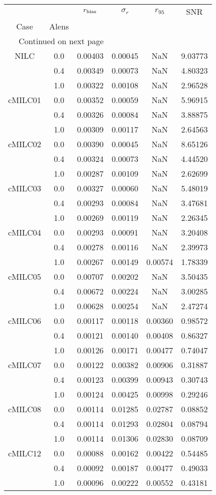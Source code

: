 \begin{longtable}{cccccc}
\toprule
     &     &  $r_{\rm bias}$  &  $\sigma_r$ &  $r_{95}$ &     SNR \\
Case & Alens &                  &             &           &         \\
\midrule
\endhead
\midrule
\multicolumn{3}{r}{{Continued on next page}} \\
\midrule
\endfoot

\bottomrule
\endlastfoot
NILC & 0.0 & 0.00403 & 0.00045 & NaN & 9.03773 \\
     & 0.4 & 0.00349 & 0.00073 & NaN & 4.80323 \\
     & 1.0 & 0.00322 & 0.00108 & NaN & 2.96528 \\
cMILC01 & 0.0 & 0.00352 & 0.00059 & NaN & 5.96915 \\
     & 0.4 & 0.00326 & 0.00084 & NaN & 3.88875 \\
     & 1.0 & 0.00309 & 0.00117 & NaN & 2.64563 \\
cMILC02 & 0.0 & 0.00390 & 0.00045 & NaN & 8.65126 \\
     & 0.4 & 0.00324 & 0.00073 & NaN & 4.44520 \\
     & 1.0 & 0.00287 & 0.00109 & NaN & 2.62699 \\
cMILC03 & 0.0 & 0.00327 & 0.00060 & NaN & 5.48019 \\
     & 0.4 & 0.00293 & 0.00084 & NaN & 3.47681 \\
     & 1.0 & 0.00269 & 0.00119 & NaN & 2.26345 \\
cMILC04 & 0.0 & 0.00293 & 0.00091 & NaN & 3.20408 \\
     & 0.4 & 0.00278 & 0.00116 & NaN & 2.39973 \\
     & 1.0 & 0.00267 & 0.00149 & 0.00574 & 1.78339 \\
cMILC05 & 0.0 & 0.00707 & 0.00202 & NaN & 3.50435 \\
     & 0.4 & 0.00672 & 0.00224 & NaN & 3.00285 \\
     & 1.0 & 0.00628 & 0.00254 & NaN & 2.47274 \\
cMILC06 & 0.0 & 0.00117 & 0.00118 & 0.00360 & 0.98572 \\
     & 0.4 & 0.00121 & 0.00140 & 0.00408 & 0.86327 \\
     & 1.0 & 0.00126 & 0.00171 & 0.00477 & 0.74047 \\
cMILC07 & 0.0 & 0.00122 & 0.00382 & 0.00906 & 0.31887 \\
     & 0.4 & 0.00123 & 0.00399 & 0.00943 & 0.30743 \\
     & 1.0 & 0.00124 & 0.00425 & 0.00998 & 0.29246 \\
cMILC08 & 0.0 & 0.00114 & 0.01285 & 0.02787 & 0.08852 \\
     & 0.4 & 0.00114 & 0.01293 & 0.02804 & 0.08794 \\
     & 1.0 & 0.00114 & 0.01306 & 0.02830 & 0.08709 \\
cMILC12 & 0.0 & 0.00088 & 0.00162 & 0.00422 & 0.54485 \\
     & 0.4 & 0.00092 & 0.00187 & 0.00477 & 0.49033 \\
     & 1.0 & 0.00096 & 0.00222 & 0.00552 & 0.43181 \\
\end{longtable}
